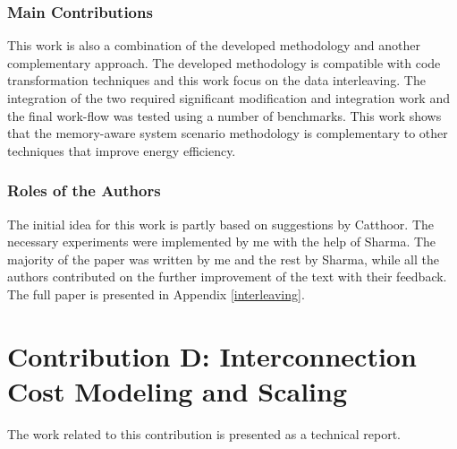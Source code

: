 \subsubsection{Main Contributions}

This work is also a combination of the developed methodology and another complementary approach.
The developed methodology is compatible with code transformation techniques and this work focus on the data interleaving.
The integration of the two required significant modification and integration work and the final work-flow was tested using a number of benchmarks.
This work shows that the memory-aware system scenario methodology is complementary to other techniques that improve energy efficiency.

\subsubsection{Roles of the Authors}

The initial idea for this work is partly based on suggestions by Catthoor. 
The necessary experiments were implemented by me with the help of Sharma.
The majority of the paper was written by me and the rest by Sharma, while all the authors contributed on the further improvement of the text with their feedback.
The full paper is presented in Appendix \ref{interleaving}.

\section{Contribution D: Interconnection Cost Modeling and Scaling}

The work related to this contribution is presented as a technical report.

